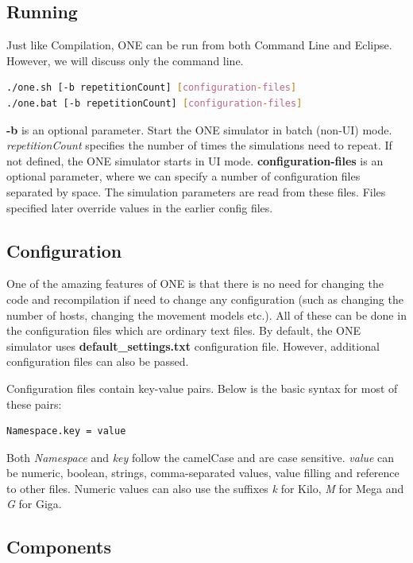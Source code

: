 \subsection{Running}
Just like Compilation, ONE can be run from both Command Line and Eclipse. However, we will discuss only the command line.

\begin{lstlisting}[language=bash]
./one.sh [-b repetitionCount] [configuration-files]
./one.bat [-b repetitionCount] [configuration-files]
\end{lstlisting}

\textbf{-b} is an optional parameter. Start the ONE simulator in batch (non-UI) mode. \textit{repetitionCount} specifies the number of times the simulations need to repeat. If not defined, the ONE simulator starts in UI mode.\newline
\textbf{configuration-files} is an optional parameter, where we can specify a number of configuration files separated by space. The simulation parameters are read from these files. Files specified later override values in the earlier config files.\newline

\subsection{Configuration}
\label{one:configuration}
One of the amazing features of ONE is that there is no need for changing the code and recompilation if need to change any configuration (such as changing the number of hosts, changing the movement models etc.). All of these can be done in the configuration files which are ordinary text files. By default, the ONE simulator uses \textbf{default\_settings.txt} configuration file. However, additional configuration files can also be passed.

Configuration files contain key-value pairs. Below is the basic syntax for most of these pairs:
\begin{lstlisting}[language=bash]
Namespace.key = value
\end{lstlisting}

Both \textit{Namespace} and \textit{key} follow the camelCase and are case sensitive. \textit{value} can be numeric, boolean, strings, comma-separated values, value filling and reference to other files. Numeric values can also use the suffixes \textit{k} for Kilo, \textit{M} for Mega and \textit{G} for Giga.

\subsection{Components}
